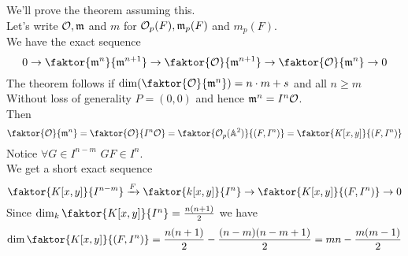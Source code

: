 \documentclass[../main.tex]{subfiles}
\begin{document}
We'll prove the theorem assuming this.\\
Let's write $\mathcal{O}, \mathfrak{m}$ and $m$ for $\mathcal{O}_p( F) ,\mathfrak { m} _p( F) $ and $m_p( F) $.\\
We have the exact sequence 
\[ 
	0\rightarrow \faktor { \mathfrak{m}^{n}} { \mathfrak{m}^{n+1}} \rightarrow \faktor { \O} { \mathfrak{m}^{n+1}} \rightarrow \faktor { \O} { \mathfrak{m}^{n}} \to 0
\]
The theorem follows if $\dim ( \faktor { \O} { \mathfrak{m}^{n}} ) = n\cdot m +s$ and all $n \geq m$ 	
Without loss of generality $P= ( 0,0) $ and hence $\mathfrak{m}^{n}= I^{n}\mathcal{O}$.\\
Then
\[ 
	\faktor { \O} { \mathfrak{m}^{n}} = \faktor { \O} { I^{n}\O} = \faktor{ \O_p( \mathbb{A}^{2}) } { ( F, I^{n} )} = \faktor { K[x,y]} { ( F,I^{n}) } 	
\]
Notice $\forall G \in I^{n-m}$ $GF\in I^{n}$.\\
We get a short exact sequence
\[ 
	\faktor { K[x,y]} { I^{n-m}} \xrightarrow{F} \faktor { k[x,y]} { I^{n}} \to \faktor { K[x,y]} { ( F,I^{n}) } \to 0
\]
Since $\dim_k \faktor { K[x,y]} { I^{n}} = \frac{n( n+1) }{2}$ we have 
\[ 
	\dim \faktor { K[x,y]} { ( F,I^{n}) } = \frac{n( n+1) }{2}- \frac{( n-m) ( n-m+1) }{2}= mn - \frac{m( m-1) }{2}
\]
\end{document}
